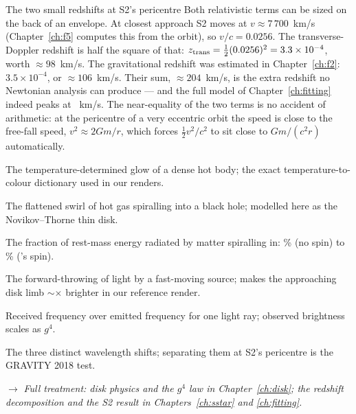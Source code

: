 \begin{worked}{The two small redshifts at S2's pericentre}
Both relativistic terms can be sized on the back of an envelope. At
closest approach S2 moves at $v \approx 7\,700$~km/s
(Chapter~\ref{ch:f5} computes this from the orbit), so
$v/c = 0.0256$. The transverse-Doppler redshift is half the square of
that: $z_{\rm trans} = \tfrac12(0.0256)^2 = 3.3\times10^{-4}$, worth
$\approx 98$~km/s. The gravitational redshift was estimated in
Chapter~\ref{ch:f2}: $3.5\times10^{-4}$, or $\approx 106$~km/s. Their
sum, $\approx 204$~km/s, is the extra redshift no Newtonian analysis
can produce — and the full model of Chapter~\ref{ch:fitting} indeed
peaks at \GrExcessPeak~km/s. The near-equality of the two terms is no
accident of arithmetic: at the pericentre of a very eccentric orbit the
speed is close to the free-fall speed, $v^2 \approx 2Gm/r$, which
forces $\tfrac12 v^2/c^2$ to sit close to $Gm/(c^2r)$ automatically.
\end{worked}

\begin{termsbox}
\item[Blackbody radiation] The temperature-determined glow of a dense
hot body; the exact temperature-to-colour dictionary used in our
renders.
\item[Accretion disk] The flattened swirl of hot gas spiralling into a
black hole; modelled here as the Novikov--Thorne thin disk.
\item[Accretion efficiency ($\eta$)] The fraction of rest-mass energy
radiated by matter spiralling in: \EtaSchw{}\% (no spin) to
\EtaSgrA{}\% (\sgra{}'s spin).
\item[Doppler beaming] The forward-throwing of light by a fast-moving
source; makes the approaching disk limb $\sim$\BeamRatio$\times$
brighter in our reference render.
\item[Redshift factor $g$] Received frequency over emitted frequency
for one light ray; observed brightness scales as $g^4$.
\item[Classical / transverse / gravitational redshift] The three
distinct wavelength shifts; separating them at S2's pericentre is the
GRAVITY 2018 test.
\end{termsbox}

\noindent$\rightarrow$ \emph{Full treatment: disk physics and the $g^4$
law in Chapter~\ref{ch:disk}; the redshift decomposition and the S2
result in Chapters~\ref{ch:sstar} and \ref{ch:fitting}.}
